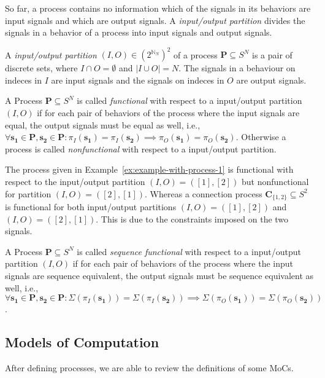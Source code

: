 So far, a process contains no information which of the signals in its behaviors are
input signals and which are output signals. A \emph{input/output partition}
divides the signals in a behavior of a process into input signals and output signals.
\begin{definition}\label{tsm-input-output-partition}
A \emph{input/output partition} $(I,O) \in \left( 2^{\mathbb{N}_N} \right)^2$
of a process $\mathbf{P} \subseteq S^N$ is a pair of discrete sets,
where $I \cap O = \emptyset$ and $|I \cup O| = N$. The signals in
a behaviour on indeces in $I$ are input signals and the
signals on indeces in $O$ are output signals.
\end{definition}
A Process $\mathbf{P} \subseteq S^N$ is called \emph{functional} with
respect to a input/output partition $(I,O)$ if for each pair of
behaviors of the process where the input signals are equal,
the output signals must be equal as well,
i.e., $\forall{\mathbf{s_1} \in \mathbf{P}, \mathbf{s_2} \in \mathbf{P}}:
\pi{}_I(\mathbf{s_1}) = \pi{}_I(\mathbf{s_2}) \implies
\pi{}_O(\mathbf{s_1}) = \pi{}_O(\mathbf{s_2})$.
Otherwise a process is called \emph{nonfunctional} with respect to a
input/output partition.

\begin{example}
The process given in Example~\ref{ex:example-with-process-1}
is functional with respect to the input/output partition $(I,O) = ([1],[2])$
but nonfunctional for partition $(I,O) = ([2],[1])$. Whereas a connection process
$\mathbf{C}_{\{1,2\}} \subseteq S^2$ is functional for both
input/output partitions $(I,O) = ([1],[2])$ and $(I,O) = ([2],[1])$.
This is due to the constraints imposed on the two signals.
\end{example}

A Process $\mathbf{P} \subseteq S^N$ is called \emph{sequence functional} with
respect to a input/output partition $(I,O)$ if for each pair of
behaviors of the process where the input signals are sequence equivalent,
the output signals must be sequence equivalent as well,
i.e., $\forall{\mathbf{s_1} \in \mathbf{P}, \mathbf{s_2} \in \mathbf{P}}:
\Sigma(\pi{}_I(\mathbf{s_1})) = \Sigma(\pi{}_I(\mathbf{s_2})) \implies
\Sigma(\pi{}_O(\mathbf{s_1})) = \Sigma(\pi{}_O(\mathbf{s_2}))$.

\subsection{Models of Computation}

After defining processes, we are able to review the definitions of some MoCs.


